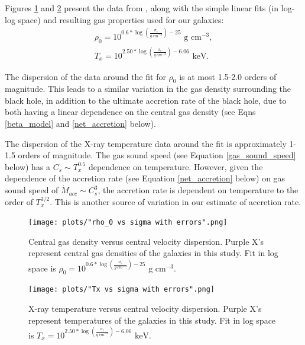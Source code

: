 \documentclass[fleqn,usenatbib,useAMS]{mnras}
\begin{document}
Figures \ref{fig:rho0_vs_sigma} and \ref{fig:Tx_vs_sigma} present the data from \citet{2018ApJ...857...32B}, along with the simple linear fits (in log-log space) and resulting gas properties used for our galaxies:
\begin{subequations} \label{eq:gas_properties}
\begin{eqnarray}
    \rho_0 = 10^{0.6*\log\left(\frac{\sigma_c}{g\ cm^{-3}}\right) - 25} \text{  g cm}^{-3},\\
    T_x = 10^{2.50*\log\left(\frac{\sigma_c}{g\ cm^{-3}}\right) - 6.06} \text{  keV}.
\end{eqnarray}
\end{subequations}

The dispersion of the data around the fit for $\rho_0$ is at most 1.5-2.0 orders of magnitude.  This leads to a similar variation in the gas density surrounding the black hole, in addition to the ultimate accretion rate of the black hole, due to both having a linear dependence on the central gas density (see Eqns \eqref{beta_model} and \eqref{net_accretion} below).

The dispersion of the X-ray temperature data around the fit is approximately 1-1.5 orders of magnitude.  The gas sound speed (see Equation \eqref{gas_sound_speed} below) has a $C_s{\sim}T_x^{0.5}$ dependence on temperature.  However, given the dependence of the accretion rate (see Equation \eqref{net_accretion} below) on gas sound speed of $\dot{M}_{acc}{\sim}C_s^3$, the accretion rate is dependent on temperature to the order of $T_x^{3/2}$.  This is another source of variation in our estimate of accretion rate.

\begin{figure}
\vspace{20pt}%
\begin{center}
\texttt{[image: plots/"rho\_0 vs sigma with errors".png]}
\caption{Central gas density versus central velocity dispersion.  Purple X's represent central gas densities of the galaxies in this study.  Fit in log space is $\rho_0 = 10^{0.6*\log\left(\frac{\sigma_c}{g\ cm^{-3}}\right) - 25} \text{  g cm}^{-3}$.}
\label{fig:rho0_vs_sigma}
\end{center}
\end{figure}

\begin{figure}
\vspace{20pt}%
\begin{center}
\texttt{[image: plots/"Tx vs sigma with errors".png]}
\caption{X-ray temperature versus central velocity dispersion.  Purple X's represent temperatures of the galaxies in this study.  Fit in log space is $T_x = 10^{2.50*\log\left(\frac{\sigma_c}{g\ cm^{-3}}\right) - 6.06} \text{  keV}$.}
\label{fig:Tx_vs_sigma}
\end{center}
\end{figure}
\end{document}
